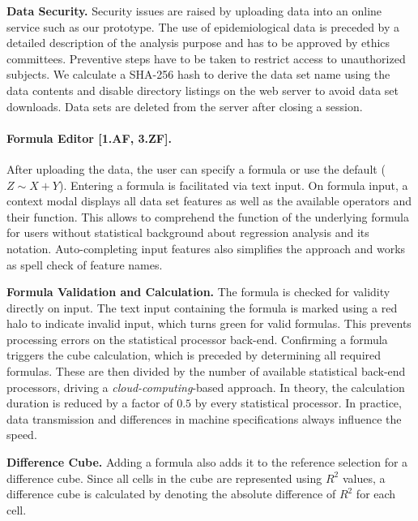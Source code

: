 \documentclass[journal]{style/vgtc} 			          %
\begin{document}
\textbf{Data Security.}
Security issues are raised by uploading data into an online service such as our prototype.
The use of epidemiological data is preceded by a detailed description of the analysis purpose and has to be approved by ethics committees.
Preventive steps have to be taken to restrict access to unauthorized subjects.
We calculate a SHA-256 hash to derive the data set name using the data contents and disable directory listings on the web server to avoid data set downloads.
Data sets are deleted from the server after closing a session.

\paragraph{Formula Editor [1.AF, 3.ZF].}
After uploading the data, the user can specify a formula or use the default ($Z \sim X + Y$).
Entering a formula is facilitated via text input.
On formula input, a context modal displays all data set features as well as the available operators and their function.
This allows to comprehend the function of the underlying formula for users without statistical background about regression analysis and its notation.
Auto-completing input features also simplifies the approach and works as spell check of feature names.

\textbf{Formula Validation and Calculation.} The formula is checked for validity directly on input.
The text input containing the formula is marked using a red halo to indicate invalid input, which turns green for valid formulas.
This prevents processing errors on the statistical processor back-end.
Confirming a formula triggers the cube calculation, which is preceded by determining all required formulas.
These are then divided by the number of available statistical back-end processors, driving a \emph{cloud-computing}-based approach.
In theory, the calculation duration is reduced by a factor of $0.5$ by every statistical processor.
In practice, data transmission and differences in machine specifications always influence the speed.

\textbf{Difference Cube.}
Adding a formula also adds it to the reference selection for a difference cube.
Since all cells in the cube are represented using $R^2$ values, a difference cube is calculated by denoting the absolute difference of $R^2$ for each cell.
\end{document}
